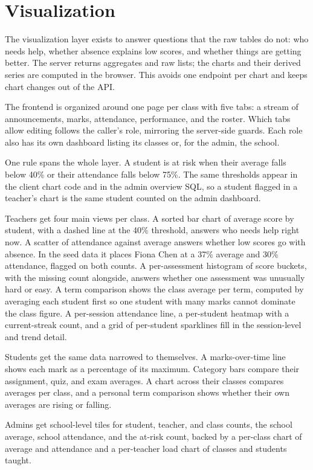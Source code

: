 \documentclass[11pt,a4paper]{article}
\begin{document}
\section{Visualization}

The visualization layer exists to answer questions that the raw tables do not: who needs help, whether absence explains low scores, and whether things are getting better. The server returns aggregates and raw lists; the charts and their derived series are computed in the browser. This avoids one endpoint per chart and keeps chart changes out of the API.

The frontend is organized around one page per class with five tabs: a stream of announcements, marks, attendance, performance, and the roster. Which tabs allow editing follows the caller's role, mirroring the server-side guards. Each role also has its own dashboard listing its classes or, for the admin, the school.

One rule spans the whole layer. A student is at risk when their average falls below 40\% or their attendance falls below 75\%. The same thresholds appear in the client chart code and in the admin overview SQL, so a student flagged in a teacher's chart is the same student counted on the admin dashboard.

Teachers get four main views per class. A sorted bar chart of average score by student, with a dashed line at the 40\% threshold, answers who needs help right now. A scatter of attendance against average answers whether low scores go with absence. In the seed data it places Fiona Chen at a 37\% average and 30\% attendance, flagged on both counts. A per-assessment histogram of score buckets, with the missing count alongside, answers whether one assessment was unusually hard or easy. A term comparison shows the class average per term, computed by averaging each student first so one student with many marks cannot dominate the class figure. A per-session attendance line, a per-student heatmap with a current-streak count, and a grid of per-student sparklines fill in the session-level and trend detail.

Students get the same data narrowed to themselves. A marks-over-time line shows each mark as a percentage of its maximum. Category bars compare their assignment, quiz, and exam averages. A chart across their classes compares averages per class, and a personal term comparison shows whether their own averages are rising or falling.

Admins get school-level tiles for student, teacher, and class counts, the school average, school attendance, and the at-risk count, backed by a per-class chart of average and attendance and a per-teacher load chart of classes and students taught.
\end{document}
